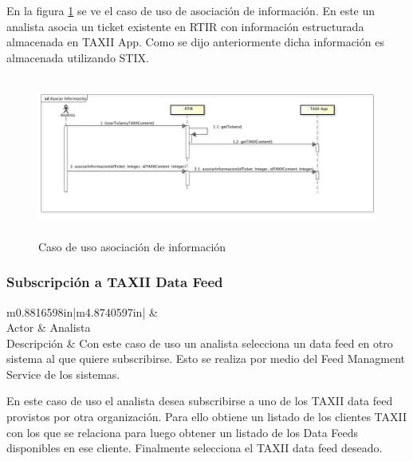\bigskip
En la figura \ref{fig.asocinfortir} se ve el caso de uso de asociación de información. En este un analista asocia un ticket existente en RTIR con información estructurada almacenada en TAXII App. Como se dijo anteriormente dicha información es almacenada utilizando STIX.

\begin{figure}[H]
	\centering
	\includegraphics[width=5.7638in,height=2.0701in]{Analisis22-img/AsociacionInformacion.png} 
	\caption{Caso de uso asociación de información}
	\label{fig.asocinfortir}
\end{figure}

\subsubsection{Subscripción a TAXII Data Feed}
\begin{flushleft}
	\tablefirsthead{}
	\tablehead{}
	\tabletail{}
	\tablelasttail{}
	\begin{supertabular}{m{0.8816598in}|m{4.8740597in}|}
		 &
		\\\hline
		{Actor} &
		{Analista}\\
		{Descripción} &
		{Con este caso de uso un analista selecciona un data feed en otro sistema al que
			quiere subscribirse. Esto se realiza por medio del Feed Managment Service de los sistemas.}\\\hhline{~-}
	\end{supertabular}
\end{flushleft}

\bigskip

En este caso de uso el analista desea subscribirse a uno de los TAXII data feed provistos por otra organización. Para
ello obtiene un listado de los clientes TAXII con los que se relaciona para luego obtener un listado de los Data Feeds
disponibles en ese cliente. Finalmente selecciona el TAXII data feed deseado.

